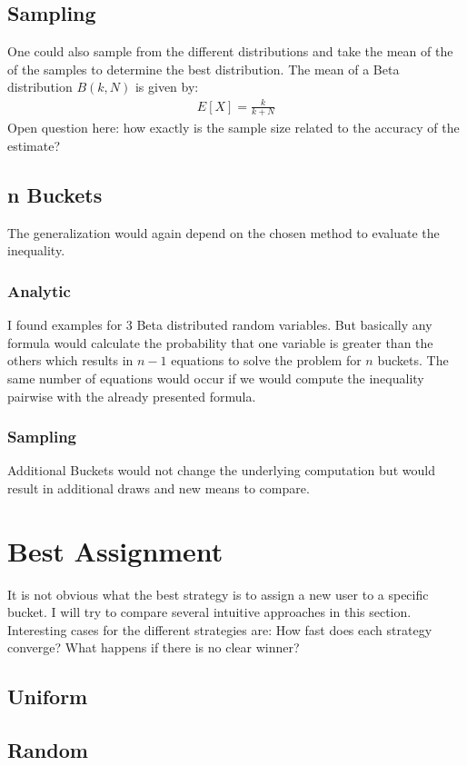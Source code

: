 \documentclass[../Thesis.tex]{subfiles}
\begin{document}
\subsection{Sampling}
One could also sample from the different distributions and take the mean of the of the samples to determine the best distribution. The mean of a Beta distribution $B(k,N)$ is given by:
\begin{align*}
E[X] = \frac{k}{k+N}
\end{align*}
Open question here: how exactly is the sample size related to the accuracy of the estimate?

\subsection{n Buckets}
The generalization would again depend on the chosen method to evaluate the inequality.
\subsubsection{Analytic}
I found examples for 3 Beta distributed random variables. But basically any formula would calculate the probability that one variable is greater than the others which results in $n-1$ equations to solve the problem for $n$ buckets. The same number of equations would occur if we would compute the inequality pairwise with the already presented formula.

\subsubsection{Sampling}
Additional Buckets would not change the underlying computation but would result in additional draws and new means to compare. 

\section{Best Assignment}
It is not obvious what the best strategy is to assign a new user to a specific bucket. I will try to compare several intuitive approaches in this section. Interesting cases for the different strategies are: How fast does each strategy converge? What happens if there is no clear winner?
\subsection{Uniform}
\subsection{Random}
\end{document}
